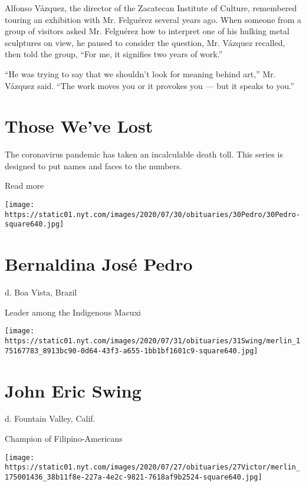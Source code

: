Alfonso Vázquez, the director of the Zacatecan Institute of Culture,
remembered touring an exhibition with Mr. Felguérez several years ago.
When someone from a group of visitors asked Mr. Felguérez how to
interpret one of his hulking metal sculptures on view, he paused to
consider the question, Mr. Vázquez recalled, then told the group, ``For
me, it signifies two years of work.''

``He was trying to say that we shouldn't look for meaning behind art,''
Mr. Vázquez said. ``The work moves you or it provokes you --- but it
speaks to you.''

\href{https://www.nytimes.com/interactive/2020/obituaries/people-died-coronavirus-obituaries.html?action=click\&pgtype=Article\&state=default\&region=BELOW_MAIN_CONTENT\&context=covid_obits_promo}{}

\hypertarget{those-weve-lost}{%
\section{Those We've Lost}\label{those-weve-lost}}

The coronavirus pandemic has taken an incalculable death toll. This
series is designed to put names and faces to the numbers.

Read more

\texttt{[image: https://static01.nyt.com/images/2020/07/30/obituaries/30Pedro/30Pedro-square640.jpg]}

\hypertarget{bernaldina-josuxe9-pedro}{%
\section{Bernaldina José Pedro}\label{bernaldina-josuxe9-pedro}}

d. Boa Vista, Brazil

Leader among the Indigenous Macuxi

\texttt{[image: https://static01.nyt.com/images/2020/07/31/obituaries/31Swing/merlin\_175167783\_8913bc90-0d64-43f3-a655-1bb1bf1601c9-square640.jpg]}

\hypertarget{john-eric-swing}{%
\section{John Eric Swing}\label{john-eric-swing}}

d. Fountain Valley, Calif.

Champion of Filipino-Americans

\texttt{[image: https://static01.nyt.com/images/2020/07/27/obituaries/27Victor/merlin\_175001436\_38b11f8e-227a-4e2c-9821-7618af9b2524-square640.jpg]}

